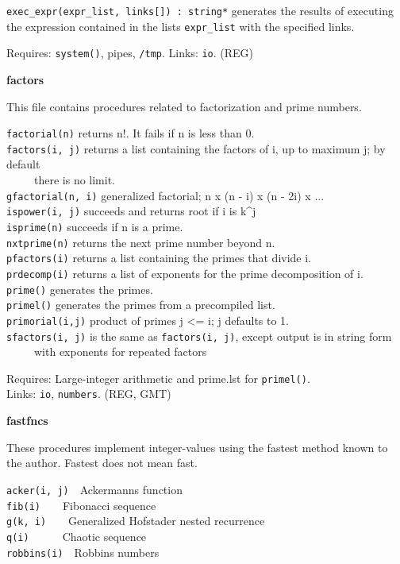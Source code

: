 \texttt{exec\_expr(expr\_list, links[]) : string*} generates the results
of executing the expression contained in the lists \texttt{expr\_list}
with the specified links.

Requires: \texttt{system()}, pipes, \texttt{/tmp}. Links: \texttt{io}.
(REG)

{\sffamily\bfseries
factors}

This file contains procedures related to factorization and prime
numbers.

\texttt{factorial(n)} returns n!. It fails if n is
less than 0.\\
\texttt{factors(i, j)} returns a list containing the factors of i, up to
maximum j; by default\\
 \ \ \ \ \ there is no limit.\\
\texttt{gfactorial(n, i)} generalized factorial; n x (n - i) x (n - 2i)
x ...\\
\texttt{ispower(i, j)} succeeds and returns root if i is k\^{}j\\
\texttt{is}\texttt{prime(n)} succeeds if n is a
prime.\\
\texttt{nxtprime(n)} returns the next prime number beyond n.\\
\texttt{pfactors(i)} returns a list containing the primes that divide
i.\\
\texttt{prdecomp(i)} returns a list of exponents for the prime
decomposition of i.\\
\texttt{prime()} generates the primes.\\
\texttt{primel()} generates the primes from a precompiled list.\\
\texttt{primorial(i,j)} product of primes j {\textless}= i; j defaults
to 1.\\
\texttt{sfactors(i, j)} is the same as \texttt{factors(i, j)}, except
output is in string form\\
 \ \ \ \ \ with exponents for repeated factors

Requires: Large-integer arithmetic and prime.lst for
\texttt{primel()}.\\
Links: \texttt{io}, \texttt{numbers}. (REG, GMT)

{\sffamily\bfseries
fastfncs}

These procedures implement integer-values using the fastest method known
to the author. {\textquotedbl}Fastest{\textquotedbl} does not mean
{\textquotedbl}fast{\textquotedbl}.

\texttt{acker(i, j)}\ \ Ackermann{\textquotesingle}s function\\
\texttt{fib(i)}\ \ \ \ Fibonacci sequence\\
\texttt{g(k, i)}\ \ \ \ Generalized Hofstader nested recurrence\\
\texttt{q(i)}\ \ \ \ \ \ {\textquotedbl}Chaotic{\textquotedbl}
sequence\\
\texttt{robbins(i)}\ \ Robbins numbers

